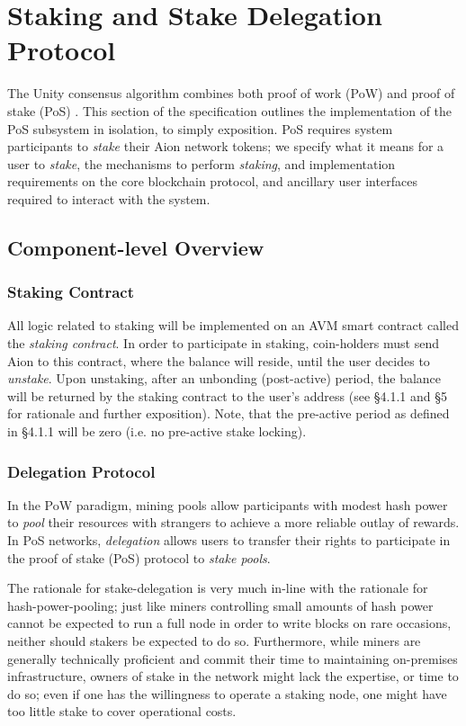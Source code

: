 \section{Staking and Stake Delegation Protocol}

The Unity consensus algorithm combines both proof of work (PoW) and proof of stake (PoS) \cite{WZS19}. This section of the specification outlines the implementation of the PoS subsystem in isolation, to simply exposition. PoS requires system participants to \textit{stake} their Aion network tokens; we specify what it means for a user to \textit{stake}, the mechanisms to perform \textit{staking}, and implementation requirements on the core blockchain protocol, and ancillary user interfaces required to interact with the system. 

\subsection{Component-level Overview}

\subsubsection{Staking Contract}
All logic related to staking will be implemented on an AVM smart contract called the \textit{staking contract}. In order to participate in staking, coin-holders must send Aion to this contract, where the balance will reside, until the user decides to \textit{unstake}. Upon unstaking, after an unbonding (post-active) period, the balance will be returned by the staking contract to the user's address (see \cite{WZS19} \S4.1.1 and \S5 for rationale and further exposition). Note, that the pre-active period as defined in \cite{WZS19} \S4.1.1 will be zero (i.e. no pre-active stake locking).  

\subsubsection{Delegation Protocol}
In the PoW paradigm, mining pools allow participants with modest hash power to \textit{pool} their resources with strangers to achieve a more reliable outlay of rewards. In PoS networks, \textit{delegation} allows users to transfer their rights to participate in the proof of stake (PoS) protocol to \textit{stake pools}. 

The rationale for stake-delegation is very much in-line with the rationale for hash-power-pooling; just like miners controlling small amounts of hash power cannot be expected to run a full node in order to write blocks on rare occasions, neither should stakers be expected to do so. Furthermore, while miners are generally technically proficient and commit their time to maintaining on-premises infrastructure, owners of stake in the network might lack the expertise, or time to do so; even if one has the willingness to operate a staking node, one might have too little stake to cover operational costs. 

